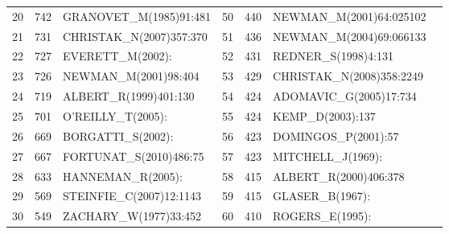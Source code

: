 \documentclass[hyperref={pdfstartview={FitBH -32768},
                         pdfpagemode=FullScreen,
                         plainpages=false,
                         colorlinks=true}
              ]{beamer}
\begin{document}
\begin{frame}[fragile]
\begin{tabular}{c|c|l||c|c|l|l}
20&   	742&   	GRANOVET\_M(1985)91:481&   	50&   	440&   	NEWMAN\_M(2001)64:025102\\
21&   	731&   	CHRISTAK\_N(2007)357:370&   	51&   	436&   	NEWMAN\_M(2004)69:066133\\
22&   	727&   	EVERETT\_M(2002):&   	52&   	431&   	REDNER\_S(1998)4:131\\
23&   	726&   	NEWMAN\_M(2001)98:404&   	53&   	429&   	CHRISTAK\_N(2008)358:2249\\
24&   	719&   	ALBERT\_R(1999)401:130&   	54&   	424&   	ADOMAVIC\_G(2005)17:734\\
25&   	701&   	O'REILLY\_T(2005):&   	55&   	424&   	KEMP\_D(2003):137\\
26&   	669&   	BORGATTI\_S(2002):&   	56&   	423&   	DOMINGOS\_P(2001):57\\
27&   	667&   	FORTUNAT\_S(2010)486:75&   	57&   	423&   	MITCHELL\_J(1969):\\
28&   	633&   	HANNEMAN\_R(2005):&   	58&   	415&   	ALBERT\_R(2000)406:378\\
29&   	569&   	STEINFIE\_C(2007)12:1143&   	59&   	415&   	GLASER\_B(1967):\\
30&   	549&   	ZACHARY\_W(1977)33:452&   	60&   	410&   	ROGERS\_E(1995):\\ \hline
\end{tabular}

\end{frame}
\end{document}
